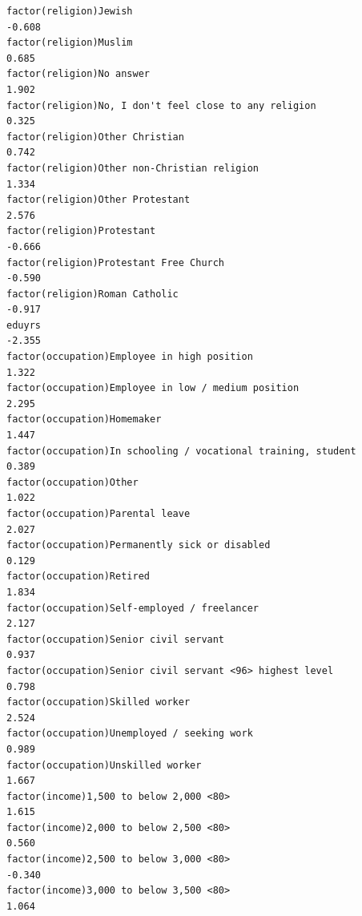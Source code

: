 \documentclass[
]{article}
\begin{document}
\begin{table}
\begin{minipage}[t]{\linewidth}
{\begin{verbatim}
factor(religion)Jewish                                                             -0.608
factor(religion)Muslim                                                              0.685
factor(religion)No answer                                                           1.902
factor(religion)No, I don't feel close to any religion                              0.325
factor(religion)Other Christian                                                     0.742
factor(religion)Other non-Christian religion                                        1.334
factor(religion)Other Protestant                                                    2.576
factor(religion)Protestant                                                         -0.666
factor(religion)Protestant Free Church                                             -0.590
factor(religion)Roman Catholic                                                     -0.917
eduyrs                                                                             -2.355
factor(occupation)Employee in high position                                         1.322
factor(occupation)Employee in low / medium position                                 2.295
factor(occupation)Homemaker                                                         1.447
factor(occupation)In schooling / vocational training, student                       0.389
factor(occupation)Other                                                             1.022
factor(occupation)Parental leave                                                    2.027
factor(occupation)Permanently sick or disabled                                      0.129
factor(occupation)Retired                                                           1.834
factor(occupation)Self-employed / freelancer                                        2.127
factor(occupation)Senior civil servant                                              0.937
factor(occupation)Senior civil servant <96> highest level                           0.798
factor(occupation)Skilled worker                                                    2.524
factor(occupation)Unemployed / seeking work                                         0.989
factor(occupation)Unskilled worker                                                  1.667
factor(income)1,500 to below 2,000 <80>                                             1.615
factor(income)2,000 to below 2,500 <80>                                             0.560
factor(income)2,500 to below 3,000 <80>                                            -0.340
factor(income)3,000 to below 3,500 <80>                                             1.064

\end{verbatim}}
\end{minipage}
\end{table}
\end{document}
